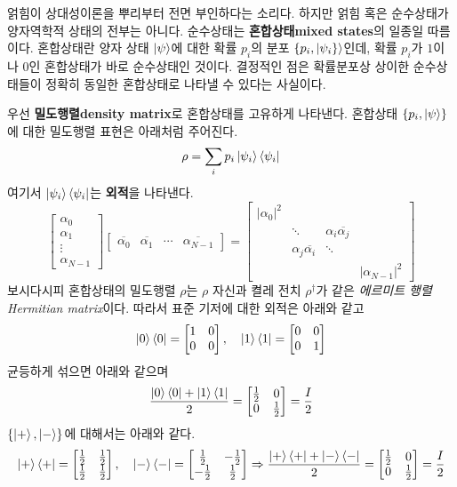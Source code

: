 \documentclass[a4paper,chapter,atbegshi]{oblivoir}
\begin{document}
얽힘이 상대성이론을 뿌리부터 전면 부인하다는 소리다.
하지만 얽힘 혹은 순수상태가 양자역학적 상태의 전부는 아니다. 순수상태는
\textbf{혼합상태\tiny mixed states}의 일종일 따름이다. 혼합상태란
양자 상태 $\ket{\psi}$에 대한 확률 $p_i$의 분포 $\{p_i,\ket{\psi_i\}}$인데,
확률 $p_i$가 $1$이나 $0$인 혼합상태가 바로 순수상태인 것이다. 결정적인 점은
확률분포상 상이한 순수상태들이 정확히 동일한 혼합상태로 나타낼 수 있다는
사실이다.

우선 \textbf{밀도행렬\tiny density matrix}로 혼합상태를 고유하게 나타낸다.
혼합상태 $\{p_i,\ket{\psi}\}$에 대한 밀도행렬 표현은 아래처럼 주어진다. 
\begin{equation}
  \rho = \sum_i p_i\ket{\psi_i}\bra{\psi_i}
\end{equation}
여기서 $\ket{\psi_i}\bra{\psi_i}$는 \textbf{외적}을 나타낸다.
\[
  \begin{bmatrix}\alpha_0\\\alpha_1\\\vdots\\\alpha_{N-1}\end{bmatrix}
  \begin{bmatrix}\overline{\alpha_0} & \overline{\alpha_1} &\cdots 
  &\overline{\alpha_{N-1}}\end{bmatrix} = \begin{bmatrix}
    |\alpha_0|^2 & & &  \\
    & \ddots & \alpha_i\overline{\alpha_j}& \\
    &\alpha_j\overline{\alpha_i}&\ddots&\\
    &&&|\alpha_{N-1}|^2
  \end{bmatrix}
\]
보시다시피 혼합상태의 밀도행렬 $\rho$는 $\rho$ 자신과 켤레 전치 $\rho^{\dagger}$가
같은 \emph{에르미트 행렬\tiny Hermitian matrix}이다. 따라서 표준 기저에 
대한 외적은 아래와 같고
\[
  \ket0\bra0=\begin{bmatrix}1&0\\0&0\end{bmatrix},\quad
  \ket1\bra1=\begin{bmatrix}0&0\\0&1\end{bmatrix}
\]
균등하게 섞으면 아래와 같으며
\[
  \frac{\ket0\bra0+\ket1\bra1}{2} =
  \begin{bmatrix}\frac{1}{2}&0\\0&\frac{1}{2}\end{bmatrix}
  =\frac{I}{2}
\]
$\{\ket+,\ket-\}$에 대해서는 아래와 같다.
\[
  \ket+\bra+=\begin{bmatrix}\frac{1}{2}&\frac{1}{2}\\\frac{1}{2}&\frac{1}{2}\end{bmatrix},\quad
  \ket-\bra-=\begin{bmatrix}\frac{1}{2}&-\frac{1}{2}\\-\frac{1}{2}&\frac{1}{2}\end{bmatrix}
  \Rightarrow\frac{\ket+\bra++\ket-\bra-}{2}=\begin{bmatrix}\frac{1}{2}&0\\0&\frac{1}{2}\end{bmatrix}=\frac{I}{2}
\]
\end{document}
